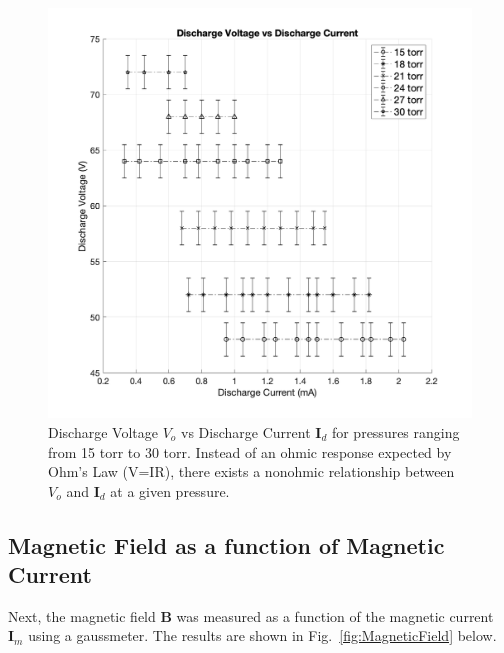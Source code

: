 \documentclass[%
 aip,
rsi,%
 amsmath,amssymb,
 reprint,%
author-numerical,%
]{revtex4-1}
\begin{document}
\begin{figure}[H]
\includegraphics[width=0.965\linewidth]{lateximages/VdvsId.png} 
\caption{\label{fig:VdvsId} Discharge Voltage $V _ { o }$ vs Discharge Current $\boldsymbol { I}_{d}$ for pressures ranging from 15 torr to 30 torr. Instead of an ohmic response expected by Ohm's Law (V=IR), there exists a nonohmic relationship between $V _ { o }$ and $\boldsymbol { I}_{d}$ at a given pressure.  }
\end{figure}

\subsection{Magnetic Field as a function of Magnetic Current}
Next, the magnetic field $\boldsymbol { B }$ was measured as a function of the magnetic current $\boldsymbol { I}_{m}$ using a gaussmeter. The results are shown in Fig.~\ref{fig:MagneticField} below. 
\end{document}
